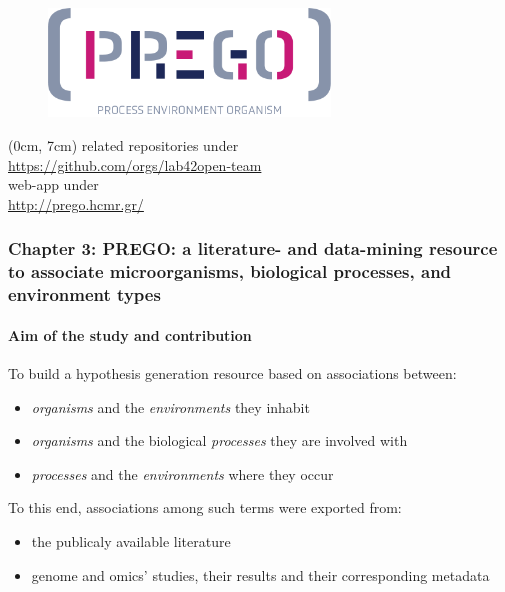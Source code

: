 \documentclass{beamer}
\begin{document}
   \begin{frame}
      
      \begin{figure}
         \includegraphics[width=75mm]{resources/prego_logo.png}
      \end{figure}

      \begin{textblock*}{12cm}(0cm, 7cm)
         \centering
         \small related repositories under \\
         \small \href{https://github.com/orgs/lab42open-team}{https://github.com/orgs/lab42open-team} \\ 
         \small web-app under\\
         \small \href{http://prego.hcmr.gr/}{http://prego.hcmr.gr/}
      \end{textblock*}

   \end{frame}
   \fi

    \begin{darkframes}
      \begin{frame}
         \frametitle{\textbf{Chapter 3}: PREGO: a literature- and data-mining
         resource to associate microorganisms,
         biological processes, and
         environment types}
         \framesubtitle{Aim of the study and contribution}

         \small
            To build a hypothesis generation resource based on associations between: 
            \begin{itemize}
               \item \textit{organisms} and the \textit{environments} they inhabit
               \item \textit{organisms} and the biological \textit{processes} they are involved with
               \item \textit{processes} and the \textit{environments} where they occur
            \end{itemize}

            To this end, associations among such terms were exported from: 
            \begin{itemize}
               \item the publicaly available literature
               \item genome and omics' studies, their results and their corresponding metadata
            \end{itemize}

      \end{frame}
   \end{darkframes}
\end{document}
